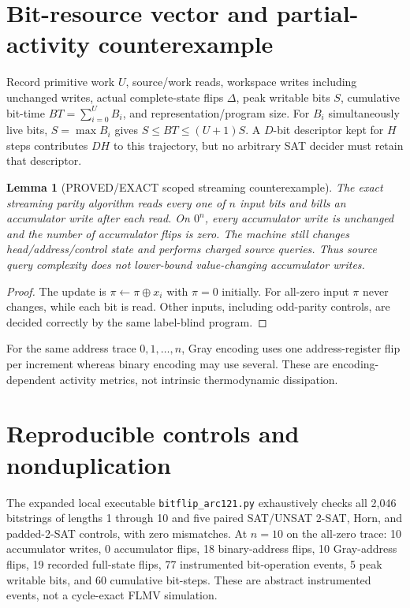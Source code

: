 \documentclass[11pt]{article}
\newtheorem{lemma}{Lemma}
\begin{document}
\section{Bit-resource vector and partial-activity counterexample}
Record primitive work $U$, source/work reads, workspace writes including unchanged writes, actual complete-state flips $\Delta$, peak writable bits $S$, cumulative bit-time $BT=\sum_{i=0}^{U}B_i$, and representation/program size. For $B_i$ simultaneously live bits, $S=\max B_i$ gives $S\le BT\le(U+1)S$. A $D$-bit descriptor kept for $H$ steps contributes $DH$ to this trajectory, but no arbitrary SAT decider must retain that descriptor.

\begin{lemma}[PROVED/EXACT scoped streaming counterexample]
The exact streaming parity algorithm reads every one of $n$ input bits and bills an accumulator write after each read. On $0^n$, every accumulator write is unchanged and the number of accumulator flips is zero. The machine still changes head/address/control state and performs charged source queries. Thus source query complexity does not lower-bound value-changing \emph{accumulator} writes.
\end{lemma}
\begin{proof}The update is $\pi\leftarrow\pi\oplus x_i$ with $\pi=0$ initially. For all-zero input $\pi$ never changes, while each bit is read. Other inputs, including odd-parity controls, are decided correctly by the same label-blind program.\end{proof}
For the same address trace $0,1,\ldots,n$, Gray encoding uses one address-register flip per increment whereas binary encoding may use several. These are encoding-dependent activity metrics, not intrinsic thermodynamic dissipation.

\section{Reproducible controls and nonduplication}
The expanded local executable \texttt{bitflip\_arc121.py} exhaustively checks all 2,046 bitstrings of lengths 1 through 10 and five paired SAT/UNSAT 2-SAT, Horn, and padded-2-SAT controls, with zero mismatches. At $n=10$ on the all-zero trace: 10 accumulator writes, 0 accumulator flips, 18 binary-address flips, 10 Gray-address flips, 19 recorded full-state flips, 77 instrumented bit-operation events, 5 peak writable bits, and 60 cumulative bit-steps. These are abstract instrumented events, not a cycle-exact FLMV simulation.
\end{document}
